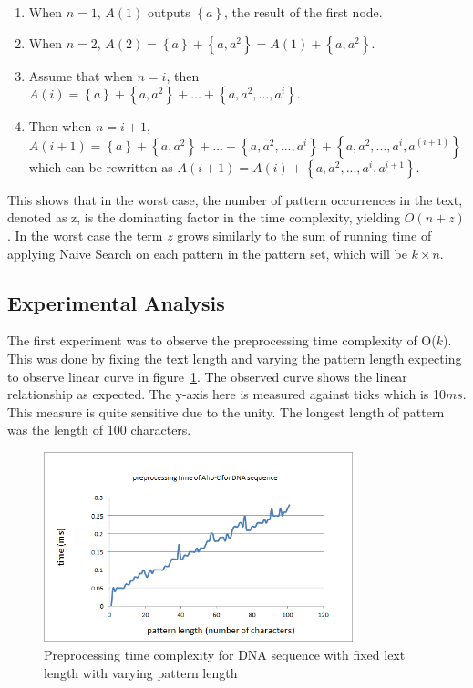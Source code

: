 \documentclass[paper=a4, fontsize=11pt]{scrartcl} %
\numberwithin{equation}{section} %
\numberwithin{figure}{section} %
\numberwithin{table}{section} %
\begin{document}
\begin{enumerate}
  \item When $n = 1$, $A(1)$ outputs $\left\{a\right\}$, the result of the first node.
  \item When $n = 2$, $A(2) = \left\{a\right\} + \left\{a, a^2\right\} = A(1) + \left\{a, a^2\right\}$.
  \item Assume that when $n = i$, then $A(i) =  \left\{a\right\} + \left\{a, a^2\right\} + \dots + \left\{a, a^2, ..., a^i\right\}$.
  \item Then when $n = i+1$, $A(i+1) = \left\{a\right\} + \left\{a, a^2\right\} + \dots + \left\{a, a^2, ..., a^i\right\} + \left\{a, a^2, ..., a^i, a^{(i+1)}\right\}$ which can be rewritten as  $A(i+1) = A(i) + \left\{a, a^2, ..., a^i, a^{i+1}\right\}$.
\end{enumerate}
This shows that in the worst case, the number of pattern occurrences in the text, denoted as z, is the dominating factor in the time complexity, yielding $O(n+z)$. In the worst case the term $z$ grows similarly to the sum of running time of applying Naive Search on each pattern in the pattern set, which will be $k\times n$.

\subsection{Experimental Analysis}
The first experiment was to observe the preprocessing time complexity of O($k$). This was done by fixing the text length and varying the pattern length expecting to observe linear curve in figure~\ref{fig:pre-fixed-text}. The observed curve shows the linear relationship as expected. The y-axis here is measured against ticks which is 10$ms$. This measure is quite sensitive due to the unity. The longest length of pattern was the length of 100 characters.

\begin{figure}[h!]
\centering
\includegraphics[width=0.8\textwidth]{figures/Pre-DNA-fixed-text.png}
\caption{Preprocessing time complexity for DNA sequence with fixed lext length with varying pattern length}
\label{fig:pre-fixed-text}
\end{figure}
\end{document}
